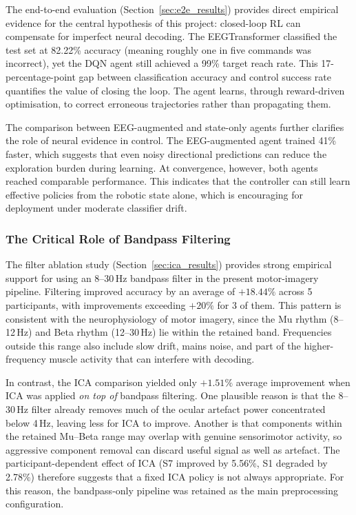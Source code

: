 \documentclass[12pt, a4paper]{article}
\begin{document}
The end-to-end evaluation (Section~\ref{sec:e2e_results}) provides direct empirical evidence for the central hypothesis of this project: closed-loop RL can compensate for imperfect neural decoding. The EEGTransformer classified the test set at 82.22\% accuracy (meaning roughly one in five commands was incorrect), yet the DQN agent still achieved a 99\% target reach rate. This 17-percentage-point gap between classification accuracy and control success rate quantifies the value of closing the loop. The agent learns, through reward-driven optimisation, to correct erroneous trajectories rather than propagating them.

The comparison between EEG-augmented and state-only agents further clarifies the role of neural evidence in control. The EEG-augmented agent trained 41\% faster, which suggests that even noisy directional predictions can reduce the exploration burden during learning. At convergence, however, both agents reached comparable performance. This indicates that the controller can still learn effective policies from the robotic state alone, which is encouraging for deployment under moderate classifier drift.

\subsubsection{The Critical Role of Bandpass Filtering}

The filter ablation study (Section~\ref{sec:ica_results}) provides strong empirical support for using an 8--30\,Hz bandpass filter in the present motor-imagery pipeline. Filtering improved accuracy by an average of $+18.44\%$ across 5 participants, with improvements exceeding $+20\%$ for 3 of them. This pattern is consistent with the neurophysiology of motor imagery, since the Mu rhythm (8--12\,Hz) and Beta rhythm (12--30\,Hz) lie within the retained band. Frequencies outside this range also include slow drift, mains noise, and part of the higher-frequency muscle activity that can interfere with decoding.

In contrast, the ICA comparison yielded only $+1.51\%$ average improvement when ICA was applied \emph{on top of} bandpass filtering. One plausible reason is that the 8--30\,Hz filter already removes much of the ocular artefact power concentrated below 4\,Hz, leaving less for ICA to improve. Another is that components within the retained Mu--Beta range may overlap with genuine sensorimotor activity, so aggressive component removal can discard useful signal as well as artefact. The participant-dependent effect of ICA (S7 improved by 5.56\%, S1 degraded by 2.78\%) therefore suggests that a fixed ICA policy is not always appropriate. For this reason, the bandpass-only pipeline was retained as the main preprocessing configuration.
\end{document}
